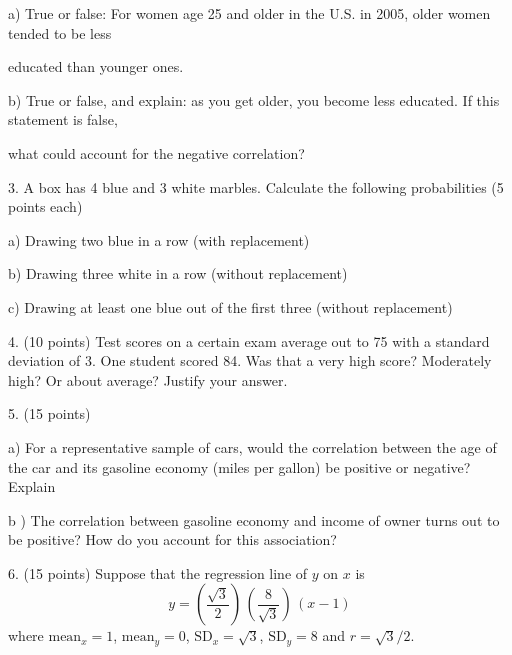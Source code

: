\documentclass[10pt]{article}
\begin{document}
\hspace{20pt} a) True or false:  For women age 25 and older in the U.S. in 2005, older women tended 
to be less\vspace{-5pt}

\hspace{20pt} \hphantom{a) }  educated than younger ones.
\bigskip

\hspace{20pt} b) True or false, and explain:  as you get older, you become less educated.  
If this statement is false,\vspace{-4pt}

\hspace{20pt} \hphantom{a) }
what could account for the negative correlation?  
\vspace{2in}


3. A box has 4 blue and 3 white marbles.  Calculate the following probabilities 
(5 points each)

\hspace{10pt} a) Drawing two blue in a row (with replacement)
\vspace{.4in}

\hspace{10pt} b) Drawing three white in a row (without replacement)\
\vspace{0.4in}

\hspace{10pt} c) Drawing at least one blue out of the first three (without replacement)
\vspace{1in}

4. (10 points) Test scores on a certain exam average out to 75 with a standard 
deviation of 3.  One student scored 84.   Was that a very high score?  Moderately high?  
Or about average?  Justify your answer.
\vfill
\eject
{\ }


5. (15 points) 

\hspace{20pt} a) For a representative sample of cars, would the correlation between the
age of the car and its gasoline economy (miles per gallon) be positive or negative?  Explain
\vspace{1.5in}

\hspace{20pt} b ) The correlation between gasoline economy and income of owner turns out to 
be positive?  How do you account for this association?
\vspace{1.5in}


6. (15 points) Suppose that the regression line of $y$ on $x$ 
is \[y=\left(\frac{\sqrt{3}}{2}\right)\,\left(\frac{8}{\sqrt{3}}\right)\,(x-1)\] 
where $\mbox{mean}_x=1$, $\mbox{mean}_y=0$, $\mbox{SD}_x=\sqrt{3}$, $\mbox{SD}_y=8$
and $r=\sqrt{3}/2$.\vspace{3pt}
\end{document}
